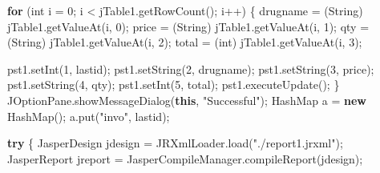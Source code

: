 \documentclass[
  10pt,
]{article}
\newenvironment{Shaded}{}{}
\newcommand{\BuiltInTok}[1]{\textcolor[rgb]{0.00,0.50,0.00}{#1}}
\newcommand{\ControlFlowTok}[1]{\textcolor[rgb]{0.00,0.44,0.13}{\textbf{#1}}}
\newcommand{\DataTypeTok}[1]{\textcolor[rgb]{0.56,0.13,0.00}{#1}}
\newcommand{\DecValTok}[1]{\textcolor[rgb]{0.25,0.63,0.44}{#1}}
\newcommand{\FunctionTok}[1]{\textcolor[rgb]{0.02,0.16,0.49}{#1}}
\newcommand{\KeywordTok}[1]{\textcolor[rgb]{0.00,0.44,0.13}{\textbf{#1}}}
\newcommand{\NormalTok}[1]{#1}
\newcommand{\OperatorTok}[1]{\textcolor[rgb]{0.40,0.40,0.40}{#1}}
\newcommand{\StringTok}[1]{\textcolor[rgb]{0.25,0.44,0.63}{#1}}
\begin{document}
\begin{Shaded}
\begin{Highlighting}[numbers=left,,]
        \ControlFlowTok{for} \OperatorTok{(}\DataTypeTok{int}\NormalTok{ i }\OperatorTok{=} \DecValTok{0}\OperatorTok{;}\NormalTok{ i }\OperatorTok{\textless{}}\NormalTok{ jTable1}\OperatorTok{.}\FunctionTok{getRowCount}\OperatorTok{();}\NormalTok{ i}\OperatorTok{++)} \OperatorTok{\{}
\NormalTok{            drugname }\OperatorTok{=} \OperatorTok{(}\BuiltInTok{String}\OperatorTok{)}\NormalTok{ jTable1}\OperatorTok{.}\FunctionTok{getValueAt}\OperatorTok{(}\NormalTok{i}\OperatorTok{,} \DecValTok{0}\OperatorTok{);}
\NormalTok{            price }\OperatorTok{=} \OperatorTok{(}\BuiltInTok{String}\OperatorTok{)}\NormalTok{ jTable1}\OperatorTok{.}\FunctionTok{getValueAt}\OperatorTok{(}\NormalTok{i}\OperatorTok{,} \DecValTok{1}\OperatorTok{);}
\NormalTok{            qty }\OperatorTok{=} \OperatorTok{(}\BuiltInTok{String}\OperatorTok{)}\NormalTok{ jTable1}\OperatorTok{.}\FunctionTok{getValueAt}\OperatorTok{(}\NormalTok{i}\OperatorTok{,} \DecValTok{2}\OperatorTok{);}
\NormalTok{            total }\OperatorTok{=} \OperatorTok{(}\DataTypeTok{int}\OperatorTok{)}\NormalTok{ jTable1}\OperatorTok{.}\FunctionTok{getValueAt}\OperatorTok{(}\NormalTok{i}\OperatorTok{,} \DecValTok{3}\OperatorTok{);}

\NormalTok{            pst1}\OperatorTok{.}\FunctionTok{setInt}\OperatorTok{(}\DecValTok{1}\OperatorTok{,}\NormalTok{ lastid}\OperatorTok{);}
\NormalTok{            pst1}\OperatorTok{.}\FunctionTok{setString}\OperatorTok{(}\DecValTok{2}\OperatorTok{,}\NormalTok{ drugname}\OperatorTok{);}
\NormalTok{            pst1}\OperatorTok{.}\FunctionTok{setString}\OperatorTok{(}\DecValTok{3}\OperatorTok{,}\NormalTok{ price}\OperatorTok{);}
\NormalTok{            pst1}\OperatorTok{.}\FunctionTok{setString}\OperatorTok{(}\DecValTok{4}\OperatorTok{,}\NormalTok{ qty}\OperatorTok{);}
\NormalTok{            pst1}\OperatorTok{.}\FunctionTok{setInt}\OperatorTok{(}\DecValTok{5}\OperatorTok{,}\NormalTok{ total}\OperatorTok{);}
\NormalTok{            pst1}\OperatorTok{.}\FunctionTok{executeUpdate}\OperatorTok{();}
        \OperatorTok{\}}
        \BuiltInTok{JOptionPane}\OperatorTok{.}\FunctionTok{showMessageDialog}\OperatorTok{(}\KeywordTok{this}\OperatorTok{,} \StringTok{"Successful"}\OperatorTok{);}
        \BuiltInTok{HashMap}\NormalTok{ a }\OperatorTok{=} \KeywordTok{new} \BuiltInTok{HashMap}\OperatorTok{();}
\NormalTok{        a}\OperatorTok{.}\FunctionTok{put}\OperatorTok{(}\StringTok{"invo"}\OperatorTok{,}\NormalTok{ lastid}\OperatorTok{);}
        
        \ControlFlowTok{try} \OperatorTok{\{}
\NormalTok{            JasperDesign jdesign }\OperatorTok{=} 
\NormalTok{                    JRXmlLoader}\OperatorTok{.}\FunctionTok{load}\OperatorTok{(}\StringTok{"./report1.jrxml"}\OperatorTok{);}
\NormalTok{            JasperReport jreport }\OperatorTok{=}\NormalTok{ JasperCompileManager}\OperatorTok{.}\FunctionTok{compileReport}\OperatorTok{(}\NormalTok{jdesign}\OperatorTok{);}
            

\end{Highlighting}
\end{Shaded}
\end{document}
